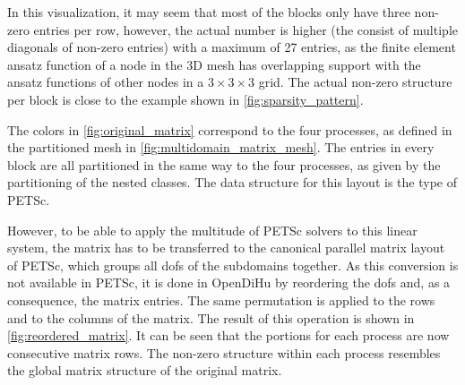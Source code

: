 In this visualization, it may seem that most of the blocks only have three non-zero entries per row, however, the actual number is higher (the  consist of multiple diagonals of non-zero entries) with a maximum of 27 entries, as the finite element ansatz function of a node in the 3D mesh has overlapping support with the ansatz functions of other nodes in a $3\times 3 \times 3$ grid.
The actual non-zero structure per block is close to the example shown in \cref{fig:sparsity_pattern}.

The colors in \cref{fig:original_matrix} correspond to the four processes, as defined in the partitioned mesh in \cref{fig:multidomain_matrix_mesh}. 
The entries in every block are all partitioned in the same way to the four processes, as given by the partitioning of the nested  classes. The data structure for this layout is the  type of PETSc. 

However, to be able to apply the multitude of PETSc solvers to this linear system, the matrix has to be transferred to the canonical parallel matrix layout of PETSc, which groups all dofs of the subdomains together. As this conversion is not available in PETSc, it is done in OpenDiHu by reordering the dofs and, as a consequence, the matrix entries. The same permutation is applied to the rows and to the columns of the matrix. The result of this operation is shown in \cref{fig:reordered_matrix}. It can be seen that the portions for each process are now consecutive matrix rows. The non-zero structure within each process resembles the global matrix structure of the original matrix.


